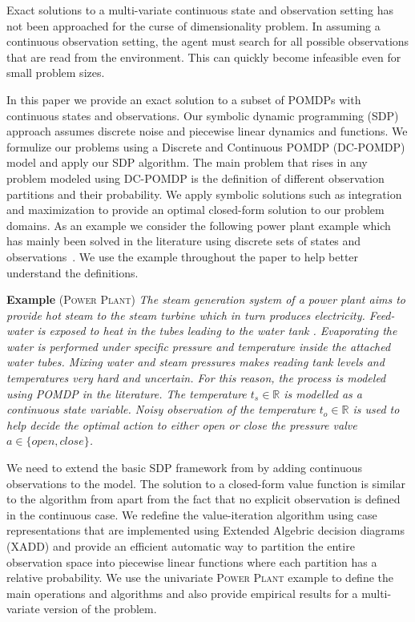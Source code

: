 \documentclass{article} %
\begin{document}
Exact solutions to a multi-variate continuous state and observation setting has not been approached for the curse of dimensionality problem. In assuming a continuous observation setting, the agent must search for all possible observations that are read from the environment. This can quickly become infeasible even for small problem sizes. 

In this paper we provide an exact solution to a subset of POMDPs with continuous states and observations. Our symbolic dynamic programming (SDP) approach assumes discrete noise and piecewise linear dynamics and functions. We formulize our problems using a Discrete and Continuous POMDP (DC-POMDP) model and apply our SDP algorithm. The main problem that rises in any problem modeled using DC-POMDP is the definition of different observation partitions and their probability. We apply symbolic solutions such as integration and maximization to provide an optimal closed-form solution to our problem domains. 
As an example we consider the following power plant example which has mainly been solved in the literature using discrete sets of states and observations~\cite{steam2}. We use the example throughout the paper to help better understand the definitions. 

\textbf{Example} \textsc{(Power Plant)}
\emph{The steam generation system of a power plant aims to provide hot steam to the steam turbine which in turn produces electricity. Feed-water is exposed to heat in the tubes leading to the water tank . Evaporating the water is performed under specific pressure and temperature inside the attached water tubes. 
Mixing water and steam pressures makes reading tank levels and temperatures very hard and uncertain. For this reason, the process is modeled using POMDP in the literature. The temperature $t_s \in \mathbb{R}$ is modelled as a continuous state variable. Noisy observation of the temperature $t_o \in \mathbb{R}$ is used to help decide the optimal action to either open or close the pressure valve $a \in \{open,close\}$.}

We need to extend the basic SDP framework from \cite{sanner_uai11} by adding continuous observations to the model. The solution to a closed-form value function is similar to the algorithm from \cite{monahan82} apart from the fact that no explicit observation is defined in the continuous case. We redefine the value-iteration algorithm using case representations that are implemented using Extended Algebric decision diagrams (XADD) and provide an efficient automatic way to partition the entire observation space into piecewise linear functions where each partition has a relative probability. We use the univariate \textsc{Power Plant} example to define the main operations and algorithms and also provide empirical results for a multi-variate version of the problem. 
\end{document}
